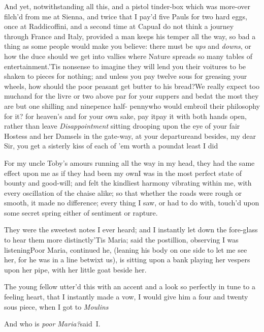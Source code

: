 \documentclass{article}
\begin{document}
And yet, notwithstanding all this, and a pistol tinder-box which
was more-\break over filch’d from me at Sienna, and twice that
I pay’d five Pauls for two hard eggs, once at
Raddicoffini, and a second time at Capua\tsk I do
not think a journey through France and Italy,
provided a man keeps his temper all the way, so bad a thing as some
people would make you believe: there must be \textit{ups} and
\textit{downs}, or how the duce should we get into vallies where
Nature spreads so many tables of entertainment.\tsk ’Tis
nonsense to imagine they will lend you their voitures to be shaken
to pieces for nothing; and unless you pay twelve sous for greasing
your wheels, how should the poor peasant get butter to his
bread?\break\tsk We really expect too much\tsk and for the livre or
two above par for your suppers and bed\tsk at the most they are
but one shilling and ninepence half-\etp{} penny\tsh who would
embroil their philosophy for it? for heaven’s and for your
own sake, pay it\tsh pay it with both hands open, rather
than leave \textit{Disappointment} sitting drooping upon the eye of
your fair Hostess and her Damsels in the gate-way, at your
departure\tsk and besides, my dear Sir, you get a sisterly kiss
of each of ’em worth a pound\tsh\break at least I
did\tsh

\tsh For my uncle Toby’s amours running all the way in my head, they had the same
effect upon me as if they had been my own\tsh I was in the most perfect state of
bounty and good-will; and felt the kindliest harmony vibrating within me, with every
oscillation of the chaise alike; so that whether the roads were rough or smooth,
it made no difference; every thing I saw, or had to do with, touch’d upon some secret
spring either of sentiment or rapture.

\tsh They were the sweetest notes I ever heard; and I instantly let down the
fore-glass to hear them more distinctly\break\tsh ’Tis Maria; said the
postillion,\break
observing I was listening\tsh Poor\break
Maria, continued he, (leaning his body on one
side to let me see her, for he was in a line betwixt us), is sitting upon a bank
playing her vespers upon her pipe, with her little goat beside her.

The young fellow utter’d this with an accent and a look so
perfectly in tune to a feeling heart, that I instantly made a vow,
I would give him a four and twenty sous piece, when I got to
\textit{Moulins}\tsh

\tsh And who is \textit{poor Maria\;?}\break said~I.
\end{document}

